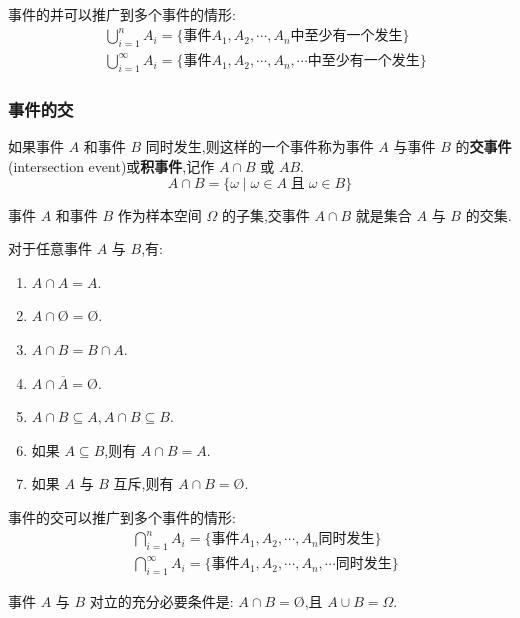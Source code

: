 事件的并可以推广到多个事件的情形:
$$
\begin{aligned}
    & \bigcup_{i=1}^n A_i = \{ \text{事件} A_1,A_2,\cdots,A_n \text{中至少有一个发生} \} \\
    & \bigcup_{i=1}^\infty A_i = \{ \text{事件} A_1,A_2,\cdots,A_n,\cdots \text{中至少有一个发生} \}
\end{aligned}
$$

\subsubsection{事件的交}

如果事件 $A$ 和事件 $B$ 同时发生,则这样的一个事件称为事件 $A$ 与事件 $B$ 的\textbf{交事件}(intersection event)或\textbf{积事件},记作 $A \cap B$ 或 $AB$.
$$
A \cap B = \{ \omega \mid \omega \in A \;\text{且}\; \omega \in B \}
$$

事件 $A$ 和事件 $B$ 作为样本空间 $\varOmega$ 的子集,交事件 $A \cap B$ 就是集合 $A$ 与 $B$ 的交集.

\begin{property}
    \indent 对于任意事件 $A$ 与 $B$,有:
    \begin{enumerate}
        \item $A \cap A = A$.
        \item $A \cap \text{\O} = \text{\O}$.
        \item $A \cap B = B \cap A$.
        \item $A \cap \overline{A} = \text{\O}$.
        \item $A \cap B \subseteq A, A \cap B \subseteq B$.
        \item 如果 $A \subseteq B$,则有 $A \cap B = A$.
        \item 如果 $A$ 与 $B$ 互斥,则有 $A \cap B = \text{\O}$.
    \end{enumerate}
\end{property}

事件的交可以推广到多个事件的情形:
$$
\begin{aligned}
    & \bigcap_{i=1}^n A_i = \{ \text{事件} A_1,A_2,\cdots,A_n \text{同时发生} \} \\
    & \bigcap_{i=1}^\infty A_i = \{ \text{事件} A_1,A_2,\cdots,A_n,\cdots \text{同时发生} \}
\end{aligned}
$$

\begin{conclusion}
    \indent 事件 $A$ 与 $B$ 对立的充分必要条件是: $A \cap B = \text{\O}$,且 $A \cup B = \varOmega$.
\end{conclusion}


